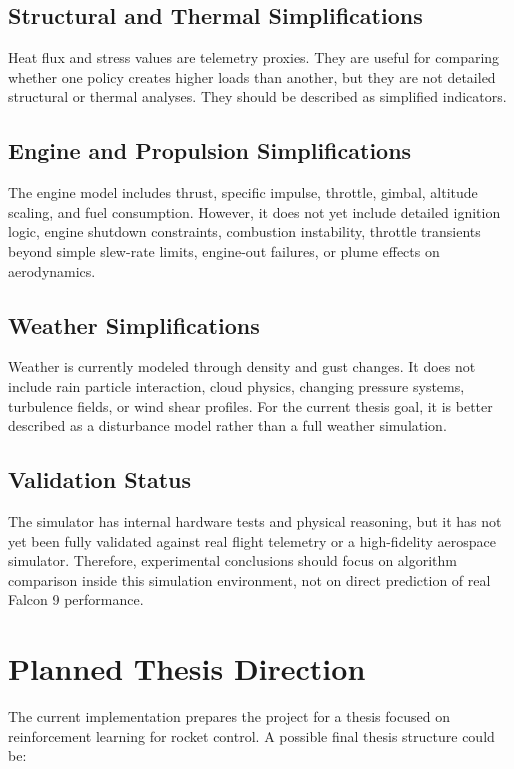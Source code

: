 \documentclass[12pt,a4paper]{article}
\begin{document}
\subsection{Structural and Thermal Simplifications}

Heat flux and stress values are telemetry proxies. They are useful for comparing whether one policy creates higher loads than another, but they are not detailed structural or thermal analyses. They should be described as simplified indicators.

\subsection{Engine and Propulsion Simplifications}

The engine model includes thrust, specific impulse, throttle, gimbal, altitude scaling, and fuel consumption. However, it does not yet include detailed ignition logic, engine shutdown constraints, combustion instability, throttle transients beyond simple slew-rate limits, engine-out failures, or plume effects on aerodynamics.

\subsection{Weather Simplifications}

Weather is currently modeled through density and gust changes. It does not include rain particle interaction, cloud physics, changing pressure systems, turbulence fields, or wind shear profiles. For the current thesis goal, it is better described as a disturbance model rather than a full weather simulation.

\subsection{Validation Status}

The simulator has internal hardware tests and physical reasoning, but it has not yet been fully validated against real flight telemetry or a high-fidelity aerospace simulator. Therefore, experimental conclusions should focus on algorithm comparison inside this simulation environment, not on direct prediction of real Falcon 9 performance.

\section{Planned Thesis Direction}

The current implementation prepares the project for a thesis focused on reinforcement learning for rocket control. A possible final thesis structure could be:
\end{document}
